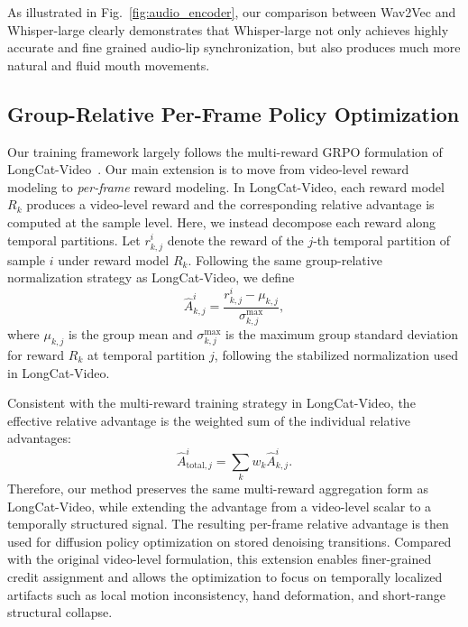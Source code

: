 As illustrated in Fig.~\ref{fig:audio_encoder}, our comparison between Wav2Vec and Whisper-large clearly demonstrates that Whisper-large not only achieves highly accurate and fine grained audio-lip synchronization, but also produces much more natural and fluid mouth movements.




\subsection{Group-Relative Per-Frame Policy Optimization}
\label{sec:grpo}

Our training framework largely follows the multi-reward GRPO formulation of LongCat-Video~\cite{team2025longcat}. 
Our main extension is to move from video-level reward modeling to \emph{per-frame} reward modeling. In LongCat-Video, each reward model $R_k$ produces a video-level reward and the corresponding relative advantage is computed at the sample level. Here, we instead decompose each reward along temporal partitions. Let $r_{k,j}^i$ denote the reward of the $j$-th temporal partition of sample $i$ under reward model $R_k$. Following the same group-relative normalization strategy as LongCat-Video, we define
\begin{equation}
\hat A_{k,j}^i
=
\frac{r_{k,j}^i-\mu_{k,j}}{\sigma_{k,j}^{\max}},
\end{equation}
where $\mu_{k,j}$ is the group mean and $\sigma_{k,j}^{\max}$ is the maximum group standard deviation for reward $R_k$ at temporal partition $j$, following the stabilized normalization used in LongCat-Video.

Consistent with the multi-reward training strategy in LongCat-Video, the effective relative advantage is the weighted sum of the individual relative advantages:
\begin{equation}
\hat A_{\mathrm{total},j}^i
=
\sum_k w_k \hat A_{k,j}^i.
\end{equation}
Therefore, our method preserves the same multi-reward aggregation form as LongCat-Video, while extending the advantage from a video-level scalar to a temporally structured signal.
The resulting per-frame relative advantage is then used for diffusion policy optimization on stored denoising transitions. Compared with the original video-level formulation, this extension enables finer-grained credit assignment and allows the optimization to focus on temporally localized artifacts such as local motion inconsistency, hand deformation, and short-range structural collapse.

